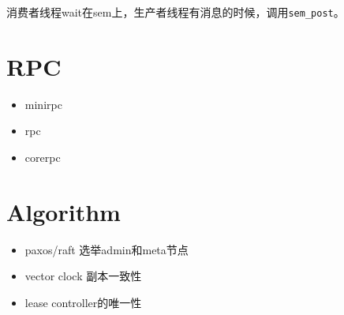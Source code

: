 消费者线程wait在sem上，生产者线程有消息的时候，调用\verb|sem_post|。

\section{RPC}

\begin{itemize}
    \item minirpc
    \item rpc
    \item corerpc
\end{itemize}

\section{Algorithm}

\begin{itemize}
    \item paxos/raft 选举admin和meta节点
    \item vector clock 副本一致性
    \item lease controller的唯一性
\end{itemize}
